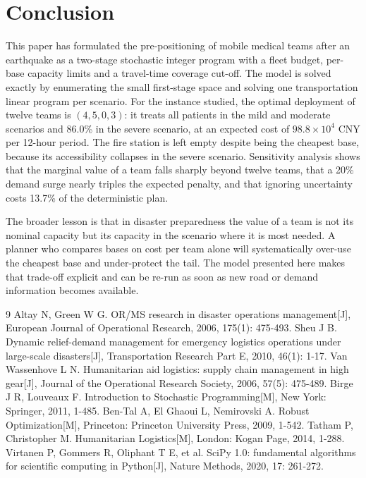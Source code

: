 \documentclass{apmcmthesis}
\begin{document}
\section{Conclusion}

This paper has formulated the pre-positioning of mobile medical teams after an earthquake as a two-stage stochastic integer program with a fleet budget, per-base capacity limits and a travel-time coverage cut-off. The model is solved exactly by enumerating the small first-stage space and solving one transportation linear program per scenario. For the instance studied, the optimal deployment of twelve teams is $(4,5,0,3)$: it treats all patients in the mild and moderate scenarios and 86.0\% in the severe scenario, at an expected cost of $98.8\times10^{4}$ CNY per 12-hour period. The fire station is left empty despite being the cheapest base, because its accessibility collapses in the severe scenario. Sensitivity analysis shows that the marginal value of a team falls sharply beyond twelve teams, that a 20\% demand surge nearly triples the expected penalty, and that ignoring uncertainty costs 13.7\% of the deterministic plan.

The broader lesson is that in disaster preparedness the value of a team is not its nominal capacity but its capacity in the scenario where it is most needed. A planner who compares bases on cost per team alone will systematically over-use the cheapest base and under-protect the tail. The model presented here makes that trade-off explicit and can be re-run as soon as new road or demand information becomes available.

\begin{thebibliography}{9}
 Altay N, Green W G. OR/MS research in disaster operations management[J], European Journal of Operational Research, 2006, 175(1): 475-493.
 Sheu J B. Dynamic relief-demand management for emergency logistics operations under large-scale disasters[J], Transportation Research Part E, 2010, 46(1): 1-17.
 Van Wassenhove L N. Humanitarian aid logistics: supply chain management in high gear[J], Journal of the Operational Research Society, 2006, 57(5): 475-489.
 Birge J R, Louveaux F. Introduction to Stochastic Programming[M], New York: Springer, 2011, 1-485.
 Ben-Tal A, El Ghaoui L, Nemirovski A. Robust Optimization[M], Princeton: Princeton University Press, 2009, 1-542.
 Tatham P, Christopher M. Humanitarian Logistics[M], London: Kogan Page, 2014, 1-288.
 Virtanen P, Gommers R, Oliphant T E, et al. SciPy 1.0: fundamental algorithms for scientific computing in Python[J], Nature Methods, 2020, 17: 261-272.
\end{thebibliography}
\end{document}
